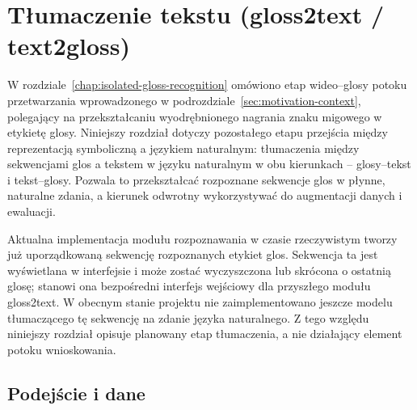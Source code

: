 
\section{Tłumaczenie tekstu (gloss2text / text2gloss)}
\label{chap:text-translation}

W rozdziale~\ref{chap:isolated-gloss-recognition} omówiono etap wideo--glosy
potoku przetwarzania wprowadzonego w podrozdziale~\ref{sec:motivation-context},
polegający na przekształcaniu wyodrębnionego nagrania znaku migowego w etykietę
glosy. Niniejszy rozdział dotyczy pozostałego etapu przejścia między reprezentacją
symboliczną a językiem naturalnym: tłumaczenia między sekwencjami glos a tekstem
w języku naturalnym w obu kierunkach -- glosy--tekst i tekst--glosy. Pozwala to
przekształcać rozpoznane sekwencje glos w płynne, naturalne zdania, a kierunek
odwrotny wykorzystywać do augmentacji danych i ewaluacji.

Aktualna implementacja modułu rozpoznawania w czasie rzeczywistym tworzy już
uporządkowaną sekwencję rozpoznanych etykiet glos. Sekwencja ta jest wyświetlana
w interfejsie i może zostać wyczyszczona lub skrócona o ostatnią glosę; stanowi
ona bezpośredni interfejs wejściowy dla przyszłego modułu gloss2text. W obecnym
stanie projektu nie zaimplementowano jeszcze modelu tłumaczącego tę sekwencję
na zdanie języka naturalnego. Z tego względu niniejszy rozdział opisuje
planowany etap tłumaczenia, a nie działający element potoku wnioskowania.

\subsection{Podejście i dane}
\label{sec:text-translation-approach-data}


